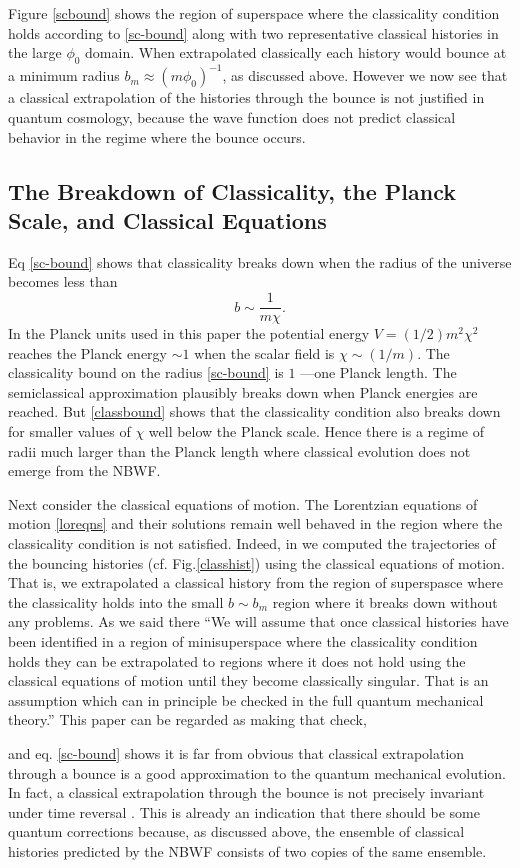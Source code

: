 \documentclass[prd,floats,superscriptaddress,eqsecnum,floatfix,nofootinbib,12pt]{revtex4}
\def\p0{\phi_0}
\def\be{\begin{equation}}
\def\ee{\end{equation}}
\def\zf{}
\def\jf{}
\def\j2{}
\def\p0{\phi_0}
\begin{document}
{{{\zf Figure \ref{scbound} shows the region of superspace where the classicality condition holds according to \eqref{sc-bound} along with two representative classical histories in the large $\p0$ domain. When extrapolated classically each history would bounce at a minimum radius $b_m \approx  (m \p0)^{-1}$, as discussed above. However we now see that a classical extrapolation of the histories through the bounce is not justified in quantum cosmology, because the wave function does not predict classical behavior in the regime where the bounce occurs.}

 
\subsection{The Breakdown of Classicality, the Planck Scale, and Classical Equations}

Eq \eqref{sc-bound} shows that classicality breaks down when the radius of the universe becomes less than
\be
\label{classbound}
b \sim \frac{1}{m\chi} .
\ee
In the Planck units used in this paper the potential energy $V=(1/2)m^2\chi^2$ reaches the Planck energy $\sim 1$ when the scalar field is $\chi\sim (1/m)$. The classicality bound on the radius \eqref{sc-bound} is $1$ ---one Planck length. The semiclassical approximation plausibly breaks down when Planck energies are reached. {\zf But \eqref{classbound} shows that the classicality condition also breaks down for smaller values of $\chi$ well below the Planck scale. Hence there is a regime of radii much larger than the Planck length where classical evolution does not  emerge from the NBWF.}

{\j2 Next consider the classical equations of motion.} The Lorentzian equations of motion \eqref{loreqns} and their solutions remain well behaved in the region where the classicality condition is not satisfied. Indeed, in \cite{HHH08a} we computed the trajectories of the bouncing histories (cf. Fig.\ref{classhist}) using the classical equations of motion. That is, we extrapolated a classical history from the region of superspasce where the classicality holds into the small $b \sim b_m$ region where it breaks down without any problems. As we said there 
``We will assume that once classical histories have been identified in a region of minisuperspace where the classicality condition holds they can be extrapolated to regions where it does not hold using the classical equations of motion until they become classically singular. That is an assumption which can in principle be checked in the full quantum mechanical theory.'' This paper can be regarded as making that check, {\zf and eq. \eqref{sc-bound} shows it is far from obvious that classical extrapolation through a bounce is a good approximation to the quantum mechanical evolution. {\jf In fact, a classical extrapolation through the bounce is not precisely invariant under time reversal \cite{HHH08a}. This is already an indication that there should be some quantum corrections because, as discussed above, the ensemble of classical histories predicted by the NBWF consists of two copies of the same ensemble.}

}}}
\end{document}
